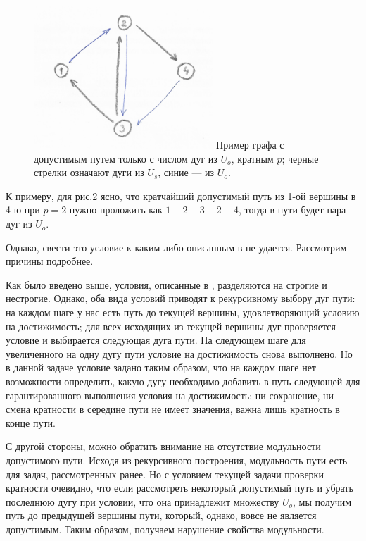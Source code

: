 \begin{figure}
	\centering
	{\includegraphics[width=0.6\textwidth]{img/2.png}}
	{Пример графа с допустимым путем только с числом дуг из $U_o$, кратным $p$; черные стрелки означают дуги из $U_s$, синие --- из $U_o$.}
	\label{fig:pic_2}
\end{figure}

К примеру, для рис.2 ясно, что кратчайший допустимый путь из 1-ой вершины в 4-ю при $p = 2$ нужно проложить как $1-2-3-2-4$, тогда в пути будет пара дуг из $U_o$.

Однако, свести это условие к каким-либо описанным в \cite{Mono} не удается. Рассмотрим причины подробнее.

Как было введено выше, условия, описанные в \cite{Mono}, разделяются на строгие и нестрогие. Однако, оба вида условий приводят к рекурсивному выбору дуг пути: на каждом шаге у нас есть путь до текущей вершины, удовлетворяющий условию на достижимость; для всех исходящих из текущей вершины дуг проверяется условие и выбирается следующая дуга пути. На следующем шаге для увеличенного на одну дугу пути условие на достижимость снова выполнено. Но в данной задаче условие задано таким образом, что на каждом шаге нет возможности определить, какую дугу необходимо добавить в путь следующей для гарантированного выполнения условия на достижимость: ни сохранение, ни смена кратности в середине пути не имеет значения, важна лишь кратность в конце пути. 

С другой стороны, можно обратить внимание на отсутствие модульности допустимого пути. Исходя из рекурсивного построения, модульность пути есть для задач, рассмотренных ранее. Но с условием текущей задачи проверки кратности очевидно, что если рассмотреть некоторый допустимый путь и убрать последнюю дугу при условии, что она принадлежит множеству $U_o$, мы получим путь до предыдущей вершины пути, который, однако, вовсе не является допустимым. Таким образом, получаем нарушение свойства модульности. 

